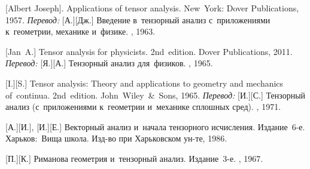 \begin{thebibliography}{123}
\begin{otherlanguage}{russian}
%
%



[Albert Joseph]. Applications of tensor analysis. New~York: Dover Publications, 1957. 
\emph{Перевод:} [А.][Дж.] Введение в~тензорный анализ с~приложениями к~геометрии, механике и~физике. \fizmatgiz, 1963. 

[Jan~A.] Tensor analysis for physicists. 2nd~edition. Dover Publications, 2011. 
\emph{Перевод:} [Я.][А.] Тензорный анализ для~физиков. \naukapublisher, 1965. 

[I.][S.] Tensor analysis: Theory and applications to geometry and mechanics of~continua. 2nd~edition. John~Wiley~\&~Sons, 1965. 
\emph{Перевод:} [И.][С.] Тензорный анализ (с~приложениями к~геометрии и~механике сплошных сред). \naukapublisher, 1971. 

[А.][И.], [И.][Е.] Векторный анализ и~начала тензорного исчисления. Издание~6\hbox{-}е. Харьков:~Вища школа. Изд\hbox{-}во при Харь\-ков\-ском ун\hbox{-}те, 1986. 

[П.][К.] Риманова геометрия и~тензорный анализ. Издание~3\hbox{-}е. \naukapublisher, 1967. 

%
%



\end{otherlanguage}
\end{thebibliography}
